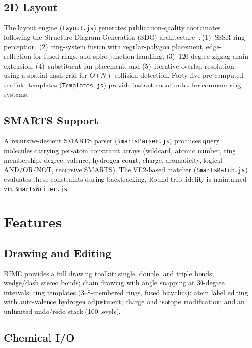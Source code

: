 \documentclass[twocolumn]{article}
\begin{document}
\subsection{2D Layout}

The layout engine (\texttt{Layout.js}) generates publication-quality
coordinates following the Structure Diagram Generation (SDG)
architecture~\citep{Helson1999}: (1)~SSSR ring perception,
(2)~ring-system fusion with regular-polygon placement, edge-reflection
for fused rings, and spiro-junction handling, (3)~120-degree zigzag
chain extension, (4)~substituent fan placement, and (5)~iterative
overlap resolution using a spatial hash grid for $O(N)$ collision
detection.  Forty-five pre-computed scaffold templates
(\texttt{Templates.js}) provide instant coordinates for common ring
systems.

\subsection{SMARTS Support}

A recursive-descent SMARTS parser (\texttt{SmartsParser.js}) produces
query molecules carrying per-atom constraint arrays (wildcard, atomic
number, ring membership, degree, valence, hydrogen count, charge,
aromaticity, logical AND/OR/NOT, recursive SMARTS).  The VF2-based
matcher (\texttt{SmartsMatch.js}) evaluates these constraints during
backtracking.  Round-trip fidelity is maintained via
\texttt{SmartsWriter.js}.

\section{Features}

\subsection{Drawing and Editing}

BIME provides a full drawing toolkit: single, double, and triple bonds;
wedge/dash stereo bonds; chain drawing with angle snapping at 30-degree
intervals; ring templates (3--8-membered rings, fused bicyclics); atom
label editing with auto-valence hydrogen adjustment; charge and isotope
modification; and an unlimited undo/redo stack (100 levels).

\subsection{Chemical I/O}
\end{document}
